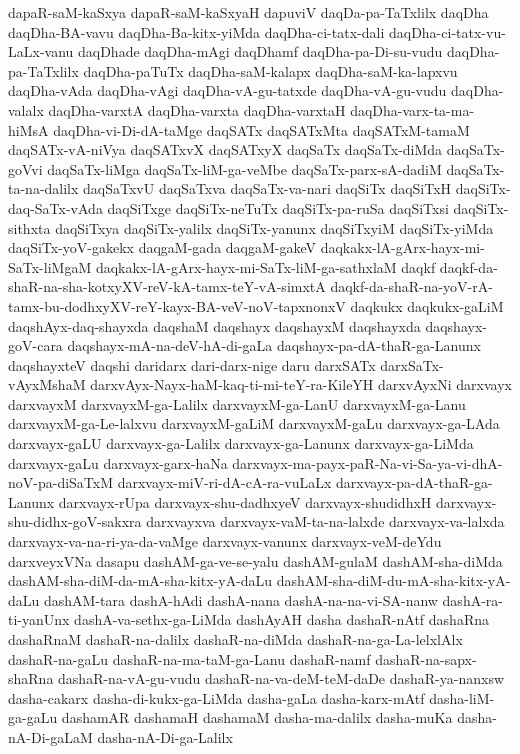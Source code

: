 {dapaR-saM-kaSxya
dapaR-saM-kaSxyaH
dapuviV
daqDa-pa-TaTxlilx
daqDha
daqDha-BA-vavu
daqDha-Ba-kitx-yiMda
daqDha-ci-tatx-dali
daqDha-ci-tatx-vu-LaLx-vanu
daqDhade
daqDha-mAgi
daqDhamf
daqDha-pa-Di-su-vudu
daqDha-pa-TaTxlilx
daqDha-paTuTx
daqDha-saM-kalapx
daqDha-saM-ka-lapxvu
daqDha-vAda
daqDha-vAgi
daqDha-vA-gu-tatxde
daqDha-vA-gu-vudu
daqDha-valalx
daqDha-varxtA
daqDha-varxta
daqDha-varxtaH
daqDha-varx-ta-ma-hiMsA
daqDha-vi-Di-dA-taMge
daqSATx
daqSATxMta
daqSATxM-tamaM
daqSATx-vA-niVya
daqSATxvX
daqSATxyX
daqSaTx
daqSaTx-diMda
daqSaTx-goVvi
daqSaTx-liMga
daqSaTx-liM-ga-veMbe
daqSaTx-parx-sA-dadiM
daqSaTx-ta-na-dalilx
daqSaTxvU
daqSaTxva
daqSaTx-va-nari
daqSiTx
daqSiTxH
daqSiTx-daq-SaTx-vAda
daqSiTxge
daqSiTx-neTuTx
daqSiTx-pa-ruSa
daqSiTxsi
daqSiTx-sithxta
daqSiTxya
daqSiTx-yalilx
daqSiTx-yanunx
daqSiTxyiM
daqSiTx-yiMda
daqSiTx-yoV-gakekx
daqgaM-gada
daqgaM-gakeV
daqkakx-lA-gArx-hayx-mi-SaTx-liMgaM
daqkakx-lA-gArx-hayx-mi-SaTx-liM-ga-sathxlaM
daqkf
daqkf-da-shaR-na-sha-kotxyXV-reV-kA-tamx-teY-vA-simxtA
daqkf-da-shaR-na-yoV-rA-tamx-bu-dodhxyXV-reY-kayx-BA-veV-noV-tapxnonxV
daqkukx
daqkukx-gaLiM
daqshAyx-daq-shayxda
daqshaM
daqshayx
daqshayxM
daqshayxda
daqshayx-goV-cara
daqshayx-mA-na-deV-hA-di-gaLa
daqshayx-pa-dA-thaR-ga-Lanunx
daqshayxteV
daqshi
daridarx
dari-darx-nige
daru
darxSATx
darxSaTx-vAyxMshaM
darxvAyx-Nayx-haM-kaq-ti-mi-teY-ra-KileYH
darxvAyxNi
darxvayx
darxvayxM
darxvayxM-ga-Lalilx
darxvayxM-ga-LanU
darxvayxM-ga-Lanu
darxvayxM-ga-Le-lalxvu
darxvayxM-gaLiM
darxvayxM-gaLu
darxvayx-ga-LAda
darxvayx-gaLU
darxvayx-ga-Lalilx
darxvayx-ga-Lanunx
darxvayx-ga-LiMda
darxvayx-gaLu
darxvayx-garx-haNa
darxvayx-ma-payx-paR-Na-vi-Sa-ya-vi-dhA-noV-pa-diSaTxM
darxvayx-miV-ri-dA-cA-ra-vuLaLx
darxvayx-pa-dA-thaR-ga-Lanunx
darxvayx-rUpa
darxvayx-shu-dadhxyeV
darxvayx-shudidhxH
darxvayx-shu-didhx-goV-sakxra
darxvayxva
darxvayx-vaM-ta-na-lalxde
darxvayx-va-lalxda
darxvayx-va-na-ri-ya-da-vaMge
darxvayx-vanunx
darxvayx-veM-deYdu
darxveyxVNa
dasapu
dashAM-ga-ve-se-yalu
dashAM-gulaM
dashAM-sha-diMda
dashAM-sha-diM-da-mA-sha-kitx-yA-daLu
dashAM-sha-diM-du-mA-sha-kitx-yA-daLu
dashAM-tara
dashA-hAdi
dashA-nana
dashA-na-na-vi-SA-nanw
dashA-ra-ti-yanUnx
dashA-va-sethx-ga-LiMda
dashAyAH
dasha
dashaR-nAtf
dashaRna
dashaRnaM
dashaR-na-dalilx
dashaR-na-diMda
dashaR-na-ga-La-lelxlAlx
dashaR-na-gaLu
dashaR-na-ma-taM-ga-Lanu
dashaR-namf
dashaR-na-sapx-shaRna
dashaR-na-vA-gu-vudu
dashaR-na-va-deM-teM-daDe
dashaR-ya-nanxsw
dasha-cakarx
dasha-di-kukx-ga-LiMda
dasha-gaLa
dasha-karx-mAtf
dasha-liM-ga-gaLu
dashamAR
dashamaH
dashamaM
dasha-ma-dalilx
dasha-muKa
dasha-nA-Di-gaLaM
dasha-nA-Di-ga-Lalilx
}
